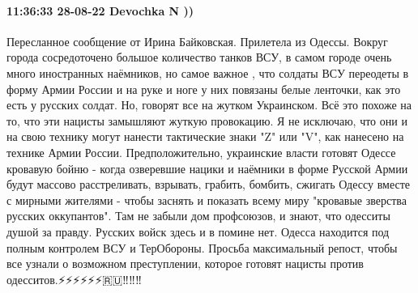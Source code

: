  
 
 
 
 

\paragraph{11:36:33 28-08-22 Devochka N ))}

Пересланное сообщение от Ирина Байковская. Прилетела из Одессы.
Вокруг города сосредоточено большое количество танков ВСУ, в самом городе очень много иностранных наёмников, но самое важное , что солдаты ВСУ переодеты в форму Армии России и на руке и ноге у них повязаны белые ленточки, как это есть у русских солдат. Но, говорят все на жутком Украинском.
Всё это похоже на то, что эти нацисты замышляют жуткую провокацию. Я не исключаю, что они и на свою технику могут нанести тактические знаки "Z" или "V", как нанесено на технике Армии России.
Предположительно, украинские власти готовят Одессе кровавую бойню - когда озверевшие нацики и наёмники в форме Русской Армии будут массово расстреливать, взрывать, грабить, бомбить, сжигать Одессу вместе с мирными жителями - чтобы заснять и показать всему миру "кровавые зверства русских оккупантов". Там не забыли дом профсоюзов, и знают, что одесситы душой за правду.
Русских войск здесь и в помине нет. Одесса находится под полным контролем ВСУ и ТерОбороны.
Просьба максимальный репост, чтобы все узнали о возможном преступлении, которое готовят нацисты против одесситов.⚡️⚡️⚡️⚡️⚡️⚡️🇷🇺‼️‼️‼
